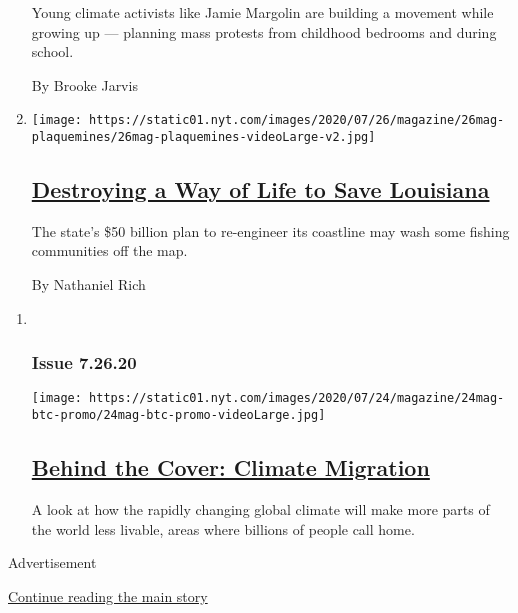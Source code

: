 \begin{enumerate}
  Young climate activists like Jamie Margolin are building a movement
  while growing up --- planning mass protests from childhood bedrooms
  and during school.

  By Brooke Jarvis
\item
  \texttt{[image: https://static01.nyt.com/images/2020/07/26/magazine/26mag-plaquemines/26mag-plaquemines-videoLarge-v2.jpg]}

  \hypertarget{destroying-a-way-of-life-to-save-louisiana}{%
  \subsection{\texorpdfstring{\href{/interactive/2020/07/21/magazine/louisiana-coast-engineering.html}{Destroying
  a Way of Life to Save
  Louisiana}}{Destroying a Way of Life to Save Louisiana}}\label{destroying-a-way-of-life-to-save-louisiana}}

  The state's \$50 billion plan to re-engineer its coastline may wash
  some fishing communities off the map.

  By Nathaniel Rich
\end{enumerate}

\begin{enumerate}
\def\labelenumi{\arabic{enumi}.}
\item ~
  \hypertarget{issue-72620}{%
  \subsubsection{Issue 7.26.20}\label{issue-72620}}

  \texttt{[image: https://static01.nyt.com/images/2020/07/24/magazine/24mag-btc-promo/24mag-btc-promo-videoLarge.jpg]}

  \hypertarget{behind-the-cover-climate-migration}{%
  \subsection{\texorpdfstring{\href{/2020/07/24/magazine/behind-the-cover-climate-migration.html}{Behind
  the Cover: Climate
  Migration}}{Behind the Cover: Climate Migration}}\label{behind-the-cover-climate-migration}}

  A look at how the rapidly changing global climate will make more parts
  of the world less livable, areas where billions of people call home.
\end{enumerate}

Advertisement

\protect\hyperlink{after-mid1}{Continue reading the main story}

